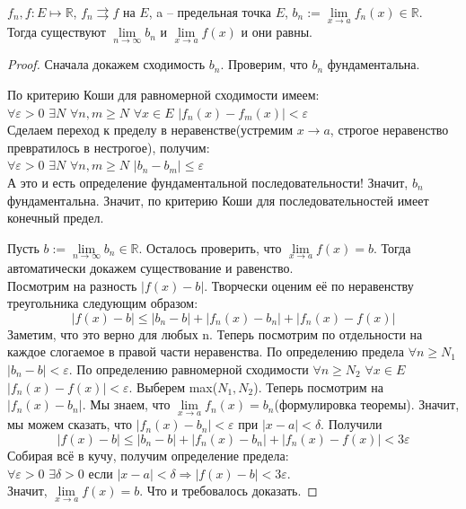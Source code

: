 
\begin{theorem} \thmslashn

  $f_n, f : E \mapsto \mathbb{R}$, $f_n \rightrightarrows f$ на $E$, a -- предельная точка $E$, $b_n := \lim\limits_{x\to a} f_n(x) \in \mathbb{R}$.\\ Тогда существуют $\lim\limits_{n\to \infty} b_n$ и $\lim\limits_{x\to a} f(x)$ и они равны.
  
\begin{proof} \thmslashn
  Сначала докажем сходимость $b_n$. Проверим, что $b_n$ фундаментальна.
  
  По критерию Коши для равномерной сходимости имеем: \\
  $\forall \varepsilon > 0$ $\exists N$ $\forall n, m \geq N$  $\forall x \in E$ $|f_n(x) - f_m(x)| < \varepsilon$\\
  Сделаем переход к пределу в неравенстве(устремим $x \to a$, строгое неравенство превратилось в нестрогое), получим: \\
   $\forall \varepsilon > 0$ $\exists N$ $\forall n, m \geq N$ $|b_n - b_m| \leq \varepsilon$\\
  А это и есть определение фундаментальной последовательности! Значит, $b_n$ фундаментальна. Значит, по критерию Коши для последовательностей имеет конечный предел.
  
  Пусть $b := \lim\limits_{n\to \infty} b_n \in \mathbb{R}$.
  Осталось проверить, что $\lim\limits_{x\to a} f(x) = b$. Тогда автоматически докажем существование и равенство.\\
  Посмотрим на разность $|f(x) - b|$. Творчески оценим её по неравенству треугольника следующим образом:\\
  \[|f(x) - b| \leq |b_n - b| + |f_n(x) - b_n| + |f_n(x) - f(x)|\]
  Заметим, что это верно для любых n. Теперь посмотрим по отдельности на каждое слогаемое в правой части неравенства. По определению предела $\forall n \geq N_1$ $|b_n - b| < \varepsilon$. По определению равномерной сходимости $\forall n \geq N_2$ $\forall x \in E$ $|f_n(x) - f(x)| < \varepsilon$. Выберем max($N_1, N_2$). Теперь посмотрим на $|f_n(x) - b_n|$. Мы знаем, что $\lim\limits_{x\to a} f_n(x) = b_n$(формулировка теоремы). Значит, мы можем сказать, что $|f_n(x) - b_n| < \varepsilon$ при $|x - a| < \delta$. Получили
  \[|f(x) - b| \leq |b_n - b| + |f_n(x) - b_n| + |f_n(x) - f(x)| < 3\varepsilon\]
  Собирая всё в кучу, получим определение предела:\\
  $\forall \varepsilon > 0$ $\exists \delta > 0$ если $|x - a| < \delta \Rightarrow |f(x) - b| < 3\varepsilon$. \\
  Значит, $\lim\limits_{x\to a} f(x) = b$. Что и требовалось доказать.
	
\end{proof}
\end{theorem}

